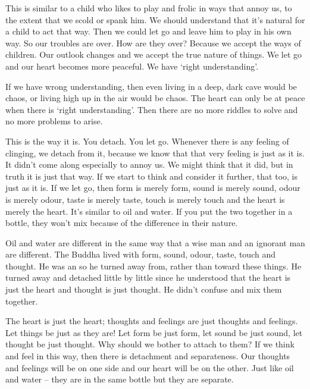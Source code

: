 This is similar to a child who likes to play and frolic in ways that annoy us, to the extent that we scold or spank him. We should understand that it's natural for a child to act that way. Then we could let go and leave him to play in his own way. So our troubles are over. How are they over? Because we accept the ways of children. Our outlook changes and we accept the true nature of things. We let go and our heart becomes more peaceful. We have `right understanding'.

If we have wrong understanding, then even living in a deep, dark cave would be chaos, or living high up in the air would be chaos. The heart can only be at peace when there is `right understanding'. Then there are no more riddles to solve and no more problems to arise.

This is the way it is. You detach. You let go. Whenever there is any feeling of clinging, we detach from it, because we know that that very feeling is just as it is. It didn't come along especially to annoy us. We might think that it did, but in truth it is just that way. If we start to think and consider it further, that too, is just as it is. If we let go, then form is merely form, sound is merely sound, odour is merely odour, taste is merely taste, touch is merely touch and the heart is merely the heart. It's similar to oil and water. If you put the two together in a bottle, they won't mix because of the difference in their nature.

Oil and water are different in the same way that a wise man and an ignorant man are different. The Buddha lived with form, sound, odour, taste, touch and thought. He was an  so he turned away from, rather than toward these things. He turned away and detached little by little since he understood that the heart is just the heart and thought is just thought. He didn't confuse and mix them together.

The heart is just the heart; thoughts and feelings are just thoughts and feelings. Let things be just as they are! Let form be just form, let sound be just sound, let thought be just thought. Why should we bother to attach to them? If we think and feel in this way, then there is detachment and separateness. Our thoughts and feelings will be on one side and our heart will be on the other. Just like oil and water -- they are in the same bottle but they are separate.

